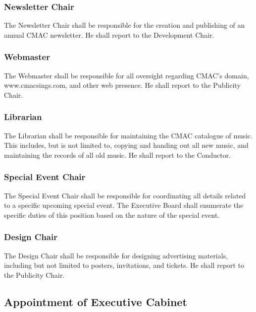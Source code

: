 \documentclass{article}
\begin{document}
\subsubsection{Newsletter Chair}

The Newsletter Chair shall be responsible for the creation and publishing
of an annual CMAC newsletter. He shall report to the Development Chair.


\subsubsection{Webmaster}

The Webmaster shall be responsible for all oversight regarding CMAC's
domain, www.cmacsings.com, and other web presence. He shall report to the
Publicity Chair.


\subsubsection{Librarian}

The Librarian shall be responsible for maintaining the CMAC catalogue
of music. This includes, but is not limited to, copying and handing
out all new music, and maintaining the records of all old music. He
shall report to the Conductor.


\subsubsection{Special Event Chair}

The Special Event Chair shall be responsible for coordinating all
details related to a specific upcoming special event. The Executive
Board shall enumerate the specific duties of this position based on
the nature of the special event.


\subsubsection{Design Chair}

The Design Chair shall be responsible for designing advertising materials,
including but not limited to posters, invitations, and tickets. He
shall report to the Publicity Chair.

\subsection{Appointment of Executive Cabinet}
\end{document}
